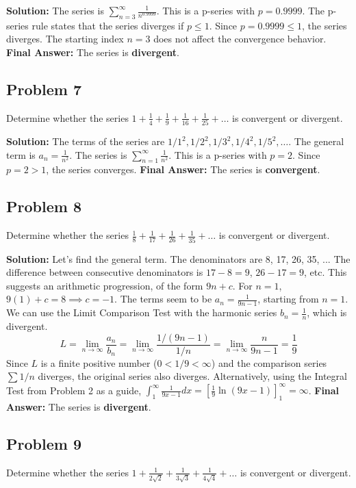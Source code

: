 \documentclass{article}
\begin{document}
\textbf{Solution:}
The series is $\sum_{n=3}^{\infty} \frac{1}{n^{0.9999}}$.
This is a p-series with $p = 0.9999$.
The p-series rule states that the series diverges if $p \le 1$.
Since $p=0.9999 \le 1$, the series diverges. The starting index $n=3$ does not affect the convergence behavior.
\textbf{Final Answer:} The series is \textbf{divergent}.

\subsection*{Problem 7}
Determine whether the series $1 + \frac{1}{4} + \frac{1}{9} + \frac{1}{16} + \frac{1}{25} + \dots$ is convergent or divergent.

\textbf{Solution:}
The terms of the series are $1/1^2, 1/2^2, 1/3^2, 1/4^2, 1/5^2, \dots$.
The general term is $a_n = \frac{1}{n^2}$. The series is $\sum_{n=1}^{\infty} \frac{1}{n^2}$.
This is a p-series with $p=2$. Since $p=2>1$, the series converges.
\textbf{Final Answer:} The series is \textbf{convergent}.

\subsection*{Problem 8}
Determine whether the series $\frac{1}{8} + \frac{1}{17} + \frac{1}{26} + \frac{1}{35} + \dots$ is convergent or divergent.

\textbf{Solution:}
Let's find the general term. The denominators are 8, 17, 26, 35, ...
The difference between consecutive denominators is $17-8=9$, $26-17=9$, etc. This suggests an arithmetic progression, of the form $9n+c$. For $n=1$, $9(1)+c=8 \implies c=-1$.
The terms seem to be $a_n = \frac{1}{9n-1}$, starting from $n=1$.
We can use the Limit Comparison Test with the harmonic series $b_n = \frac{1}{n}$, which is divergent.
\[ L = \lim_{n\to\infty} \frac{a_n}{b_n} = \lim_{n\to\infty} \frac{1/(9n-1)}{1/n} = \lim_{n\to\infty} \frac{n}{9n-1} = \frac{1}{9} \]
Since $L$ is a finite positive number ($0 < 1/9 < \infty$) and the comparison series $\sum 1/n$ diverges, the original series also diverges.
Alternatively, using the Integral Test from Problem 2 as a guide, $\int_1^\infty \frac{1}{9x-1} dx = [\frac{1}{9}\ln(9x-1)]_1^\infty = \infty$.
\textbf{Final Answer:} The series is \textbf{divergent}.

\subsection*{Problem 9}
Determine whether the series $1 + \frac{1}{2\sqrt{2}} + \frac{1}{3\sqrt{3}} + \frac{1}{4\sqrt{4}} + \dots$ is convergent or divergent.
\end{document}
